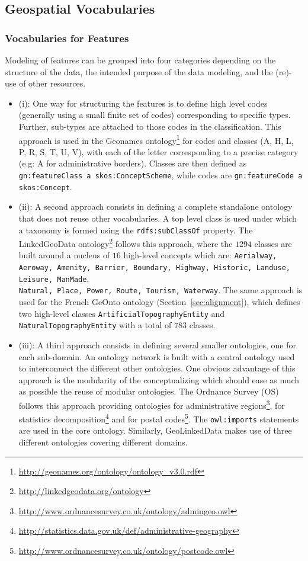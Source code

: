 \subsection{Geospatial Vocabularies}
\label{sec:geospatialvocabs} 

\subsubsection{Vocabularies for Features}
Modeling of features can be grouped into four categories depending on the structure of the data, the intended purpose of the data modeling, and the (re)-use of other resources.
\begin{itemize}
  \item (i): One way for structuring the features is to define high level codes (generally using a small finite set of codes) corresponding to specific
      types. Further, sub-types are attached to those codes in the classification. This approach is used in the Geonames ontology\footnote{\url{http://geonames.org/ontology/ontology_v3.0.rdf}} for codes and classes (A, H, L, P, R, S, T, U, V), with each of the letter corresponding to a precise category (e.g: A for administrative borders). Classes are then defined as \texttt{gn:featureClass a skos:ConceptScheme}, while codes are \texttt{gn:featureCode a skos:Concept}.
      
  \item (ii): A second approach consists in defining a complete standalone ontology that does not reuse other vocabularies. A top level class is used under which a taxonomy is formed using the \texttt{rdfs:subClassOf} property. The LinkedGeoData ontology\footnote{\url{http://linkedgeodata.org/ontology}} follows this approach, where the $1294$ classes are built around a nucleus of $16$ high-level concepts which are: \texttt{Aerialway, Aeroway, Amenity, Barrier, Boundary, Highway, Historic, Landuse, Leisure, ManMade},\\ \texttt{Natural, Place, Power, Route, Tourism, Waterway}. The same approach is used for the French GeOnto ontology (Section~\ref{sec:alignment}), which defines two high-level classes \texttt{ArtificialTopographyEntity} and \texttt{Natural\-TopographyEntity} with a total of $783$ classes.
  
  \item (iii): A third approach consists in defining several smaller ontologies, one for each sub-domain. An ontology network is built with a central ontology used to interconnect the different other ontologies. One obvious advantage of this approach is the modularity of the conceptualizing which should ease as much as possible the reuse of modular ontologies. The Ordnance Survey (OS) follows this approach providing ontologies for administrative regions\footnote{\url{http://www.ordnancesurvey.co.uk/ontology/admingeo.owl}}, for statistics decomposition\footnote{\url{http://statistics.data.gov.uk/def/administrative-geography}} and for postal codes\footnote{\url{http://www.ordnancesurvey.co.uk/ontology/postcode.owl}}. The \texttt{owl:imports} statements are used in the core ontology. Similarly, GeoLinkedData makes use of three different ontologies covering different domains.
  

\end{itemize}
